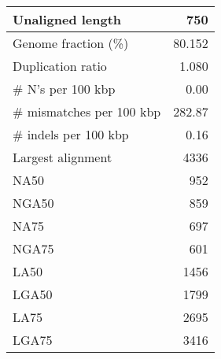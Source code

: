 \documentclass[12pt,a4paper]{article}
\begin{document}
\begin{table}[ht]
\begin{center}
\begin{tabular}{|l*{1}{|r}|}
Unaligned length & 750 \\ \hline
Genome fraction (\%) & 80.152 \\ \hline
Duplication ratio & 1.080 \\ \hline
\# N's per 100 kbp & 0.00 \\ \hline
\# mismatches per 100 kbp & 282.87 \\ \hline
\# indels per 100 kbp & 0.16 \\ \hline
Largest alignment & 4336 \\ \hline
NA50 & 952 \\ \hline
NGA50 & 859 \\ \hline
NA75 & 697 \\ \hline
NGA75 & 601 \\ \hline
LA50 & 1456 \\ \hline
LGA50 & 1799 \\ \hline
LA75 & 2695 \\ \hline
LGA75 & 3416 \\ \hline
\end{tabular}
\end{center}
\end{table}
\end{document}
